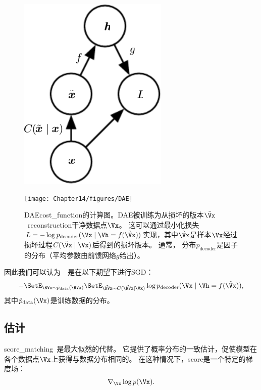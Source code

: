 \begin{figure}[!htb]
\ifOpenSource
\centerline{\includegraphics[scale=0.5]{images/120.png}}
\else
\centerline{\texttt{[image: Chapter14/figures/DAE]}}
\fi
\caption{\gls{DAE}\gls{cost_function}的计算图。\gls{DAE}被训练为从损坏的版本$\tilde \Vx$~\gls{reconstruction}干净数据点$\Vx$。
这可以通过最小化损失$L = - \log p_{\text{decoder}} (\Vx \mid \Vh = f(\tilde \Vx))$实现，其中$\tilde \Vx$是样本$\Vx$经过损坏过程$C (\tilde \Vx \mid \Vx)$后得到的损坏版本。
通常， 分布$p_{\text{decoder}}$是因子的分布（平均参数由前馈网络$g$给出）。
}
\label{fig:chap14_DAE}
\end{figure}

因此我们可以认为~~是在以下期望下进行\gls{SGD}：
\begin{align}
   - \SetE_{\RVx \sim \hat{p}_{\text{data}}(\RVx)} \SetE_{\tilde{\RVx} \sim C(\tilde{\RVx}\mid\Vx)} \log p_{\text{decoder}}(\Vx \mid \Vh = f(\tilde{\Vx})),
\end{align}
其中$\hat{p}_{\text{data}}(\Vx)$是训练数据的分布。


\subsection{估计}
\label{sec:estimating_the_score}
\gls{score_matching}~\citep{Hyvarinen-2005}是最大似然的代替。
它提供了概率分布的一致估计，促使模型在各个数据点$\Vx$上获得与数据分布相同的。
在这种情况下，\gls{score}是一个特定的梯度场：
\begin{align}
 \nabla_{\Vx} \log p(\Vx) .
\end{align}

